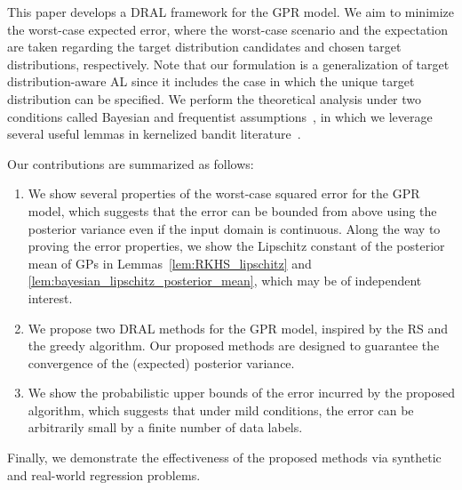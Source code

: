 This paper develops a DRAL framework for the GPR model.
% 
We aim to minimize the worst-case expected error, where the worst-case scenario and the expectation are taken regarding the target distribution candidates and chosen target distributions, respectively.
%
Note that our formulation is a generalization of target distribution-aware AL since it includes the case in which the unique target distribution can be specified.
%
We perform the theoretical analysis under two conditions called Bayesian and frequentist assumptions~\citep{Srinivas2010-Gaussian}, in which we leverage several useful lemmas in kernelized bandit literature~\citep{Srinivas2010-Gaussian,vakili2021-optimal,vakili2021-information,Kusakawa2022-bayesian}.
%




Our contributions are summarized as follows:
\begin{enumerate}
    \item We show several properties of the worst-case squared error for the GPR model, which suggests that the error can be bounded from above using the posterior variance even if the input domain is continuous. Along the way to proving the error properties, we show the Lipschitz constant of the posterior mean of GPs in Lemmas~\ref{lem:RKHS_lipschitz} and \ref{lem:bayesian_lipschitz_posterior_mean}, which may be of independent interest.
    \item We propose two DRAL methods for the GPR model, inspired by the RS and the greedy algorithm. Our proposed methods are designed to guarantee the convergence of the (expected) posterior variance.
    \item We show the probabilistic upper bounds of the error incurred by the proposed algorithm, which suggests that under mild conditions, the error can be arbitrarily small by a finite number of data labels.
\end{enumerate}
Finally, we demonstrate the effectiveness of the proposed methods via synthetic and real-world regression problems.

